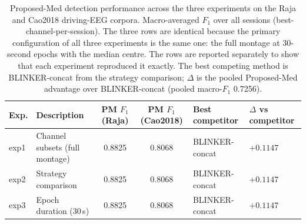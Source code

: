 \begin{table}[ht]
  \centering
  \caption{Proposed-Med detection performance across the three experiments on the Raja and Cao2018 driving-EEG corpora. Macro-averaged $F_1$ over all sessions (best-channel-per-session). The three rows are identical because the primary configuration of all three experiments is the same one: the full montage at 30-second epochs with the median centre. The rows are reported separately to show that each experiment reproduced it exactly. The best competing method is BLINKER-concat from the strategy comparison; $\Delta$ is the pooled Proposed-Med advantage over BLINKER-concat (pooled macro-$F_1$ 0.7256).}
  \label{tab:exp_summary}
  \begin{tabular}{llccll}
    \toprule
    Exp. & Description & PM $F_1$ (Raja) & PM $F_1$ (Cao2018) & Best competitor & $\Delta$ vs competitor \\
    \midrule
    exp1 & Channel subsets (full montage) & 0.8825 & 0.8068 & BLINKER-concat & $+0.1147$ \\
    exp2 & Strategy comparison & 0.8825 & 0.8068 & BLINKER-concat & $+0.1147$ \\
    exp3 & Epoch duration (30\,s) & 0.8825 & 0.8068 & BLINKER-concat & $+0.1147$ \\
    \bottomrule
  \end{tabular}
\end{table}

